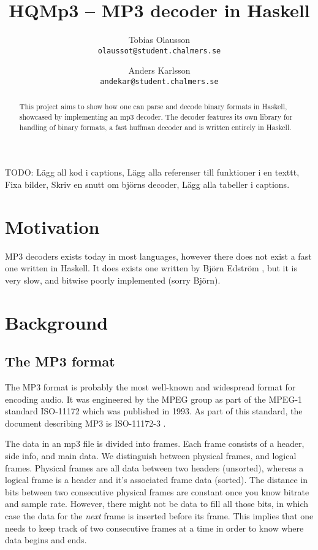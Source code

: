 \documentclass[a4paper,12pt]{article}
\title{HQMp3 -- MP3 decoder in Haskell}
\author{Tobias Olausson \\ \texttt{\small{olaussot@student.chalmers.se}} \and
        Anders Karlsson \\ \texttt{\small{andekar@student.chalmers.se}}
}
\date{ \rule{0.8 \linewidth}{0.5mm} \\[3mm]
       University of Gothenburg \\
       \small{\today}
}
\begin{document}
\maketitle

\begin{abstract}
    This project aims to show how one can parse and decode binary formats in
    Haskell, showcased by implementing an mp3 decoder. The decoder features its
    own library for handling of binary formats, a fast huffman decoder and is
    written entirely in Haskell.
\end{abstract}

\tableofcontents


TODO: Lägg all kod i captions,
      Lägg alla referenser till funktioner i en texttt,
      Fixa bilder,
      Skriv en snutt om björns decoder,
      Lägg alla tabeller i captions.

\section{Motivation}
    MP3 decoders exists today in most languages, however there does not exist
    a fast one written in Haskell. It does exists one written by Björn Edström
    \cite{bjorn}, but it is very slow, and bitwise poorly implemented (sorry
    Björn).

\section{Background}
    \subsection{The MP3 format}
       The MP3 format is probably the most well-known and widespread format for
       encoding audio. It was engineered by the MPEG group as part of the MPEG-1
       standard ISO-11172 which was published in 1993. As part of this standard,
       the document describing MP3 is ISO-11172-3 \cite{wikimp3,wikimpeg1}.

       The data in an mp3 file is divided into frames. Each frame consists of
       a header, side info, and main data. We distinguish between physical
       frames, and logical frames. Physical frames are all data between two
       headers (unsorted), whereas a logical frame is a header and it's
       associated frame data (sorted). The distance in bits between two
       consecutive physical frames are constant once you know bitrate and sample
       rate. However, there might not be data to fill all those bits, in which
       case the data for the \textit{next} frame is inserted before its frame.
       This implies that one needs to keep track of two consecutive frames at a
       time in order to know where data begins and ends.
\end{document}
